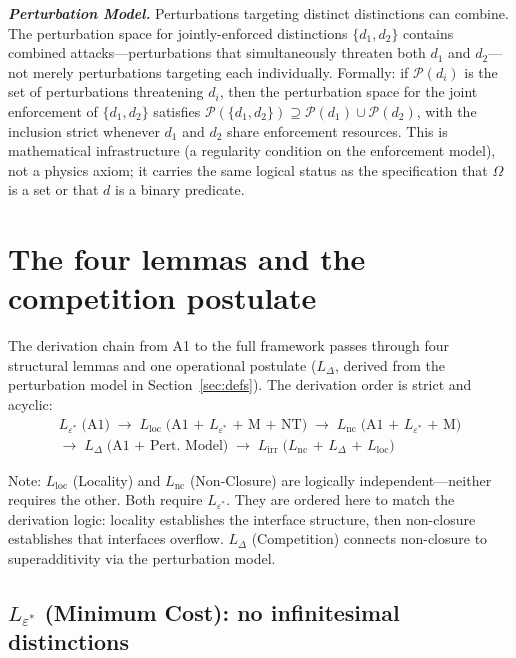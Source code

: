\documentclass[11pt]{article}
\begin{document}
\begin{tcolorbox}[apfbox, title={Definitions (Distinction, Enforcement Cost, Interface, Admissible State, Capacity)}]
\medskip
\textbf{\textit{Perturbation Model.}} Perturbations targeting distinct distinctions can combine.  The perturbation space for jointly-enforced distinctions $\{d_1, d_2\}$ contains combined attacks---perturbations that simultaneously threaten both $d_1$ and $d_2$---not merely perturbations targeting each individually.  Formally: if $\mathcal{P}(d_i)$ is the set of perturbations threatening $d_i$, then the perturbation space for the joint enforcement of $\{d_1, d_2\}$ satisfies $\mathcal{P}(\{d_1, d_2\}) \supseteq \mathcal{P}(d_1) \cup \mathcal{P}(d_2)$, with the inclusion strict whenever $d_1$ and $d_2$ share enforcement resources.  This is mathematical infrastructure (a regularity condition on the enforcement model), not a physics axiom; it carries the same logical status as the specification that $\Omega$ is a set or that $d$ is a binary predicate.
\end{tcolorbox}


\section{The four lemmas and the competition postulate}
\label{sec:lemmas}

The derivation chain from A1 to the full framework passes through four structural lemmas and one operational postulate ($L_\Delta$, derived from the perturbation model in Section~\ref{sec:defs}).  The derivation order is strict and acyclic:
\begin{multline*}
L_{\varepsilon^*}\;\text{(A1)} \;\to\; L_{\mathrm{loc}}\;\text{(A1 + $L_{\varepsilon^*}$ + M + NT)} \;\to\; L_{\mathrm{nc}}\;\text{(A1 + $L_{\varepsilon^*}$ + M)} \\
\to\; L_{\Delta}\;\text{(A1 + Pert.\ Model)} \;\to\; L_{\mathrm{irr}}\;\text{($L_{\mathrm{nc}}$ + $L_\Delta$ + $L_{\mathrm{loc}}$)}
\end{multline*}

Note: $L_{\mathrm{loc}}$ (Locality) and $L_{\mathrm{nc}}$ (Non-Closure) are logically independent---neither requires the other.  Both require $L_{\varepsilon^*}$.  They are ordered here to match the derivation logic: locality establishes the interface structure, then non-closure establishes that interfaces overflow.  $L_\Delta$ (Competition) connects non-closure to superadditivity via the perturbation model.


\subsection{\texorpdfstring{$L_{\varepsilon^*}$}{L epsilon*} (Minimum Cost): no infinitesimal distinctions}
\label{sec:eps_star}
\end{document}
